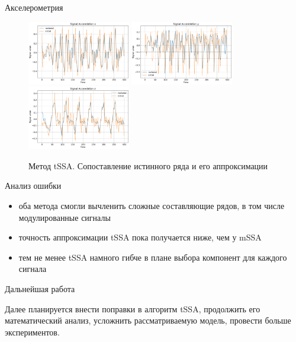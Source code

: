 \begin{frame}{Акселерометрия}
{			\begin{figure}
				\includegraphics[width=0.4\textwidth, keepaspectratio]{img/tssa_acceler_compar1.png}
				\includegraphics[width=0.4\textwidth, keepaspectratio]{img/tssa_acceler_compar2.png}
				\includegraphics[width=0.4\textwidth, keepaspectratio]{img/tssa_acceler_compar3.png}
				\caption{Метод tSSA. Сопоставление истинного ряда и его аппроксимации}
			\end{figure}
			
		}
		
	\end{frame}
	
	\begin{frame}{Анализ ошибки}
		
		\begin{itemize}
			\item оба метода смогли вычленить сложные составляющие рядов, в том числе модулированные сигналы
			
			\item точность аппроксимации tSSA пока получается ниже, чем у mSSA
			
			\item тем не менее tSSA намного гибче в плане выбора компонент для каждого сигнала
		\end{itemize}
		
	\end{frame}
	
	\begin{frame}{Дальнейшая работа}
		
		Далее планируется внести поправки в алгоритм tSSA, продолжить его математический анализ, усложнить рассматриваемую модель, провести больше экспериментов.
		
	\end{frame}

	
	
